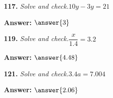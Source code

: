 \documentclass{ximera}
\begin{document}
\begin{problem}
\textbf{117.} \emph{Solve and check.}\quad $10y - 3y = 21$

\textbf{Answer:} $\answer{3}$
\end{problem}

\begin{problem}
\textbf{119.} \emph{Solve and check.}\quad $\dfrac{x}{1.4} = 3.2$

\textbf{Answer:} $\answer{4.48}$
\end{problem}

\begin{problem}
\textbf{121.} \emph{Solve and check.}\quad $3.4a = 7.004$

\textbf{Answer:} $\answer{2.06}$
\end{problem}
\end{document}
